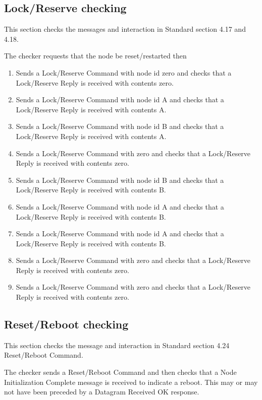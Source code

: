 \subsection{Lock/Reserve checking}

This section checks the messages and interaction in Standard section 4.17 and 4.18.

The checker requests that the node be reset/restarted then 

\begin{enumerate}
\item Sends a Lock/Reserve Command with node id zero
    and checks that a Lock/Reserve Reply is received with contents zero.
\item Sends a Lock/Reserve Command with node id A
    and checks that a Lock/Reserve Reply is received with contents A.
\item Sends a Lock/Reserve Command with node id B
    and checks that a Lock/Reserve Reply is received with contents A.
\item Sends a Lock/Reserve Command with zero 
    and checks that a Lock/Reserve Reply is received with contents zero.
\item Sends a Lock/Reserve Command with node id B
    and checks that a Lock/Reserve Reply is received with contents B.
\item Sends a Lock/Reserve Command with node id A
    and checks that a Lock/Reserve Reply is received with contents B.
\item Sends a Lock/Reserve Command with node id A
    and checks that a Lock/Reserve Reply is received with contents B.
\item Sends a Lock/Reserve Command with zero 
    and checks that a Lock/Reserve Reply is received with contents zero.
\item Sends a Lock/Reserve Command with zero 
    and checks that a Lock/Reserve Reply is received with contents zero.

\end{enumerate}

\subsection{Reset/Reboot checking}

This section checks the message and interaction in Standard section 4.24 Reset/Reboot Command.

The checker sends a Reset/Reboot Command and then checks that a Node Initialization 
Complete message is received to indicate a reboot.  This may or may not have been
preceded by a Datagram Received OK response.

  
